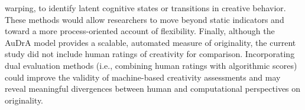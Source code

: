 \documentclass[../MA_Thesis.tex]{subfiles}
\begin{document}
warping, to identify latent cognitive states or transitions in creative behavior. These methods would allow researchers to move beyond static indicators and toward a more process-oriented account of flexibility. Finally, although the AuDrA model provides a scalable, automated measure of originality, the current study did not include human ratings of creativity for comparison. Incorporating dual evaluation methods (i.e., combining human ratings with algorithmic scores) could improve the validity of machine-based creativity assessments and may reveal meaningful divergences between human and computational perspectives on originality.
\end{document}
